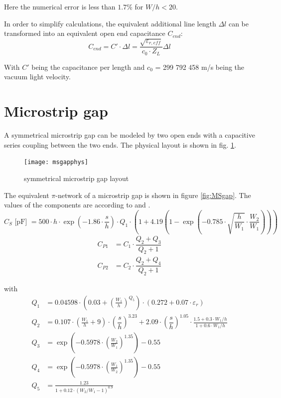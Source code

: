 \documentclass[10pt]{report}
\begin{document}
Here the numerical error is less than $1.7$\% for $W/h < 20$.

\addvspace{12pt}

In order to simplify calculations, the equivalent additional line
length $\Delta l$ can be transformed into an equivalent open end
capacitance $C_{end}$:
\begin{equation}
\label{eqn:Cend}
C_{end} = C'\cdot \Delta l = \dfrac{\sqrt{\varepsilon_{r,eff}}}{c_0\cdot Z_L} \Delta l
\end{equation}

With $C'$ being the capacitance per length and $c_0$ = 299 792 458 m/s
being the vacuum light velocity.

\section{Microstrip gap}

A symmetrical microstrip gap can be modeled by two open ends with a
capacitive series coupling between the two ends.  The physical layout
is shown in fig. \ref{fig:MSgaPhys}.

\begin{figure}[ht]
\begin{center}
\texttt{[image: msgapphys]}
\end{center}
\caption{symmetrical microstrip gap layout}
\label{fig:MSgaPhys}
\end{figure}
\FloatBarrier

The equivalent $\pi$-network of a microstrip gap is shown in figure
\ref{fig:MSgap}.  The values of the components are according to
\cite{Kirschning8} and \cite{Kirschning4}.
\begin{equation}
C_S \textrm{ [pF] } = 500\cdot h\cdot\exp\left( -1.86\cdot\dfrac{s}{h} \right)\cdot Q_1\cdot
       \left( 1 + 4.19\left( 1 - \exp\left( -0.785\cdot\sqrt{\dfrac{h}{W_1}}\cdot
       \dfrac{W_2}{W_1} \right) \right) \right)
\end{equation}
\begin{align}
C_{P1} &= C_1\cdot \dfrac{Q_2+Q_3}{Q_2+1}\\
C_{P2} &= C_2\cdot \dfrac{Q_2+Q_4}{Q_2+1}
\end{align}

with
\begin{align}
Q_1 &= 0.04598\cdot \left( 0.03 + \left(\frac{W_1}{h}\right)^{Q_5} \right)\cdot
      (0.272 + 0.07\cdot\varepsilon_r)\\
Q_2 &= 0.107\cdot\left( \frac{W_1}{h}+9 \right) \cdot \left( \dfrac{s}{h} \right)^{3.23}
    + 2.09 \cdot \left( \dfrac{s}{h} \right)^{1.05}\cdot
    \frac{1.5+0.3\cdot W_1/h}{1+0.6\cdot W_1/h}\\
Q_3 &= \exp\left( -0.5978\cdot \left( \frac{W_2}{W_1} \right)^{1.35} \right) - 0.55\\
Q_4 &= \exp\left( -0.5978\cdot \left( \frac{W_1}{W_2} \right)^{1.35} \right) - 0.55\\
Q_5 &= \frac{1.23}{1 + 0.12\cdot \left( W_2 / W_1 - 1 \right)^{0.9}}
\end{align}
\end{document}
